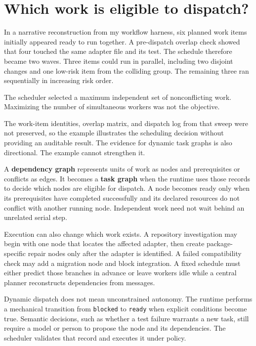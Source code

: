 \hypertarget{which-work-is-eligible-to-dispatch}{%
\section{Which work is eligible to dispatch?}\label{which-work-is-eligible-to-dispatch}}

In a narrative reconstruction from my workflow harness, six planned work items initially appeared ready to run together. A pre-dispatch overlap check showed that four touched the same adapter file and its test. The schedule therefore became two waves. Three items could run in parallel, including two disjoint changes and one low-risk item from the colliding group. The remaining three ran sequentially in increasing risk order.

The scheduler selected a maximum independent set of nonconflicting work. Maximizing the number of simultaneous workers was not the objective.

The work-item identities, overlap matrix, and dispatch log from that sweep were not preserved, so the example illustrates the scheduling decision without providing an auditable result. The evidence for dynamic task graphs is also directional. The example cannot strengthen it.

A \textbf{dependency graph} represents units of work as nodes and prerequisites or conflicts as edges. It becomes a \textbf{task graph} when the runtime uses those records to decide which nodes are eligible for dispatch. A node becomes ready only when its prerequisites have completed successfully and its declared resources do not conflict with another running node. Independent work need not wait behind an unrelated serial step.

Execution can also change which work exists. A repository investigation may begin with one node that locates the affected adapter, then create package-specific repair nodes only after the adapter is identified. A failed compatibility check may add a migration node and block integration. A fixed schedule must either predict those branches in advance or leave workers idle while a central planner reconstructs dependencies from messages.

Dynamic dispatch does not mean unconstrained autonomy. The runtime performs a mechanical transition from \texttt{blocked} to \texttt{ready} when explicit conditions become true. Semantic decisions, such as whether a test failure warrants a new task, still require a model or person to propose the node and its dependencies. The scheduler validates that record and executes it under policy.

